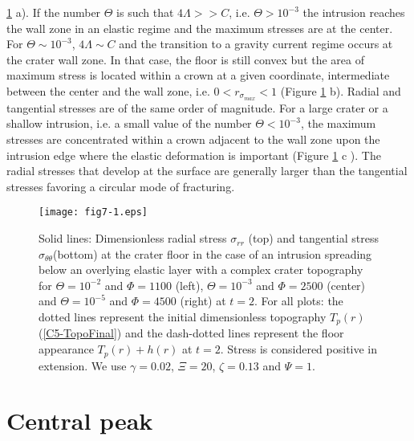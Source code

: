 \ref{C5-fig7-1} a). If the number $\Theta$ is such that $4\Lambda>>C$,
i.e.   $\Theta>10^{-3}$ the  intrusion  reaches the  wall  zone in  an
elastic  regime and  the  maximum  stresses are  at  the center.   For
$\Theta\sim10^{-3}$, $4\Lambda \sim C$ and the transition to a gravity
current regime occurs at the crater wall zone. In that case, the floor
is still  convex but the  area of maximum  stress is located  within a
crown at a  given coordinate, intermediate between the  center and the
wall  zone, i.e.   $0<r_{\sigma_{max}}<1$ (Figure  \ref{C5-fig7-1} b).
Radial and tangential stresses are of the same order of magnitude. For
a large  crater or  a shallow  intrusion, i.e.  a  small value  of the
number $\Theta<10^{-3}$, the maximum  stresses are concentrated within
a crown  adjacent to the wall  zone upon the intrusion  edge where the
elastic  deformation is  important (Figure  \ref{C5-fig7-1} c  ).  The
radial stresses that develop at  the surface are generally larger than
the tangential stresses favoring a circular mode of fracturing.
\begin{figure}[h!]
  \begin{center}
    \graphicspath{{/Users/thorey/Documents/These/Submission/Article/FFC_JGR_2013/Paper_APRES_2nd_REVIEW/}}
    \texttt{[image: fig7-1.eps]}
    \caption{Solid  lines: Dimensionless  radial stress  $\sigma_{rr}$
      (top) and tangential  stress $\sigma_{\theta \theta}$(bottom) at
      the crater floor in the case  of an intrusion spreading below an
      overlying  elastic layer  with a  complex crater  topography for
      $\Theta=10^{-2}$  and $\Phi=1100$  (left), $\Theta=10^{-3}$  and
      $\Phi=2500$  (center)   and  $\Theta=10^{-5}$   and  $\Phi=4500$
      (right) at $t=2$. For all  plots: the dotted lines represent the
      initial  dimensionless topography  $T_p(r)$ (\ref{C5-TopoFinal})
      and  the  dash-dotted  lines   represent  the  floor  appearance
      $T_p(r)+h(r)$  at  $t=2$.   Stress  is  considered  positive  in
      extension.   We use  $\gamma=0.02$,  $\Xi=20$, $\zeta=0.13$  and
      $\Psi=1$.}
    \label{C5-fig7-1}
  \end{center}
\end{figure}

\section{Central peak}
\label{C5-AppendixC}

